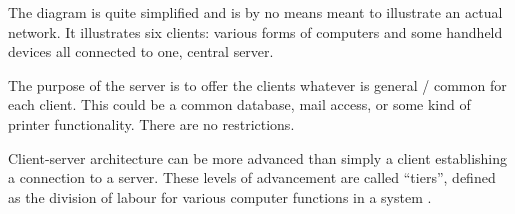 The diagram is quite simplified and is by no means meant to illustrate an actual network. It
illustrates six clients: various forms of computers and some handheld devices all connected
to one, central server.


The purpose of the server is to offer the clients whatever is general / common for each
client. This could be a common database, mail access, or some kind of printer  
functionality\cite{ooad01}. There are no restrictions. 


Client-server architecture can be more advanced than simply a client establishing a
connection to a server. These levels of advancement are called 
``tiers'', defined as the division of labour for various computer 
functions in a system \cite{tierserverclient08}.




